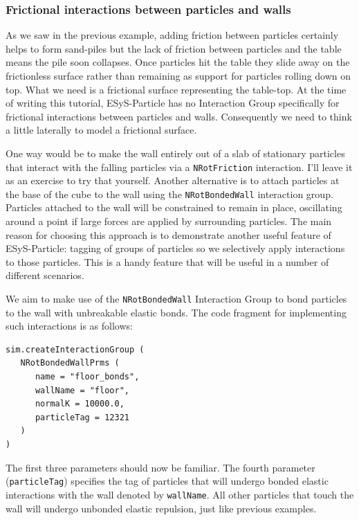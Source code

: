 \subsubsection{Frictional interactions between particles and walls}

As we saw in the previous example, adding friction between particles certainly helps to form sand-piles but the lack of friction between particles and the table means the pile soon collapses. Once particles hit the table they slide away on the frictionless surface rather than remaining as support for particles rolling down on top. What we need is a frictional surface representing the table-top. At the time of writing this tutorial, ESyS-Particle has no Interaction Group specifically for frictional interactions between particles and walls. Consequently we need to think a little laterally to model a frictional surface.

One way would be to make the wall entirely out of a slab of stationary particles that interact with the falling particles via a \texttt{NRotFriction} interaction. I'll leave it as an exercise to try that yourself. Another alternative is to attach particles at the base of the cube to the wall using the \texttt{NRotBondedWall} interaction group. Particles attached to the wall will be constrained to remain in place, oscillating around a point if large forces are applied by surrounding particles. The main reason for choosing this approach is to demonstrate another useful feature of ESyS-Particle: tagging of groups of particles so we selectively apply interactions to those particles. This is a handy feature that will be useful in a number of different scenarios.

We aim to make use of the \texttt{NRotBondedWall} Interaction Group to bond particles to the wall with unbreakable elastic bonds. The code fragment for implementing such interactions is as follows:

\begin{verbatim}
sim.createInteractionGroup (
   NRotBondedWallPrms (
      name = "floor_bonds",
      wallName = "floor",
      normalK = 10000.0,
      particleTag = 12321
   )
)
\end{verbatim}

\noindent
The first three parameters should now be familiar. The fourth parameter (\texttt{particleTag}) specifies the tag of particles that will undergo bonded elastic interactions with the wall denoted by \texttt{wallName}. All other particles that touch the wall will undergo unbonded elastic repulsion, just like previous examples. 

